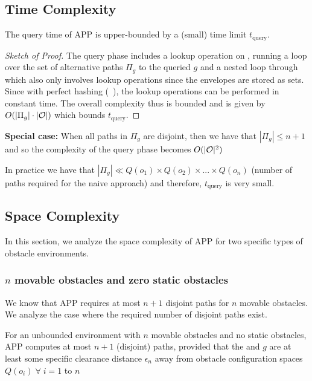 \documentclass[a4paper]{report}
\begin{document}
\subsection{Time Complexity}
\label{sec:complexity_app}
\begin{lemma}
The query time of APP is upper-bounded by a (small) time limit $t_{\textrm {query}}$.
\label{lemma1}
\end{lemma}
\begin{proof}[Sketch of Proof]
The query phase includes a lookup operation on \calM, running a loop over the set of alternative paths $\Pi_g$ to the queried $g$ and a nested loop through \calO which also only involves lookup operations since the envelopes are stored as sets. Since with perfect hashing (~\cite{czech1997perfect}), the lookup operations can be performed in constant time. The overall complexity thus is bounded and is given by $O(|\Pi_g|\cdot |\mathcal{O}|)$ which bounds $t_{\textrm {query}}$.
\end{proof}

\textbf{Special case:} When all paths in $\Pi_g$ are disjoint, then we have that $|\Pi_g| \leq n+1$ and so the complexity of the query phase becomes $O(|\mathcal{O}|^2)$

In practice we have that $|\Pi_g| \ll Q(o_1) \times Q(o_2) \times ... \times Q(o_n)$ (number of paths required for the naive approach) and therefore, $t_{\textrm {query}}$ is very small.

\subsection{Space Complexity}
In this section, we analyze the space complexity of APP for two specific types of obstacle environments.

\subsubsection{$n$ movable obstacles and zero static obstacles}
We know that APP requires at most $n+1$ disjoint paths for $n$ movable obstacles. We analyze the case where the required number of disjoint paths exist.

\vspace{2mm}
\begin{lemma}
For an unbounded environment with $n$ movable obstacles and no static obstacles, APP computes at most $n+1$ (disjoint) paths, provided that the \Sstart and $g$ are at least some specific clearance distance $\epsilon_n$ away from obstacle configuration spaces $Q(o_i) \; \forall \; i = 1$ to $n$
\end{lemma}
\end{document}
